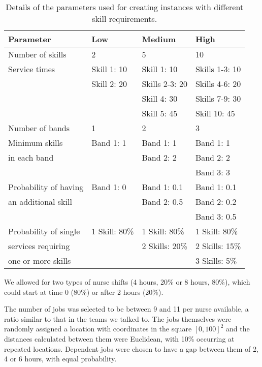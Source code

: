\begin{table}[htbp!]
	\centering
	\caption{Details of the parameters used for creating instances with different skill requirements.}
	\begin{tabular}{|l|l|l|l|}
	\hline
		\textbf{Parameter} & \textbf{Low} & \textbf{Medium} & \textbf{High} \\
		\hline
		Number of skills   &  2 & 5 & 10\\ \hline
		Service times   &  Skill 1: 10 & Skill 1: 10 &Skills 1-3: 10\\
						&  Skill 2: 20 & Skills 2-3: 20 & Skills 4-6: 20 \\
						&  			   & Skill 4: 30 & Skills 7-9: 30 \\
						&  			   & Skill 5: 45 & Skill 10: 45 \\ \hline
		Number of bands & 1 & 2 & 3 \\ \hline
		Minimum skills & Band 1: 1 & Band 1: 1 & Band 1: 1 \\
		in each band  & 			 & Band 2: 2 & Band 2: 2 \\
										& 			 &  & Band 3: 3 \\ \hline
		Probability of having & Band 1: 0 & Band 1: 0.1 & Band 1: 0.1 \\
		an additional skill  & 			 & Band 2: 0.5 & Band 2: 0.2 \\
										& 			 &  & Band 3: 0.5 \\ \hline
		Probability of single & 1 Skill: 80\% & 1 Skill: 80\% & 1 Skill: 80\% \\		
		services requiring 	 & 				 & 2 Skills: 20\% & 2 Skills: 15\% \\		
		one or more skills   & 				 & & 3 Skills: 5\% \\ \hline
	\end{tabular}\label{Appendix:Tab:SkillMixConfiguration}
\end{table}

We allowed for two types of nurse shifts (4 hours, 20\% or 8 hours, 80\%), which could start at time 0 (80\%) or after 2 hours (20\%).


The number of jobs was selected to be between 9 and 11 per nurse available, a ratio similar to that in the teams we talked to. The jobs themselves were randomly assigned a location with coordinates in the square $[0, 100]^2$ and the distances calculated between them were Euclidean, with 10\% occurring at repeated locations. Dependent jobs were chosen to have a gap between them of 2, 4 or 6 hours, with equal probability.

